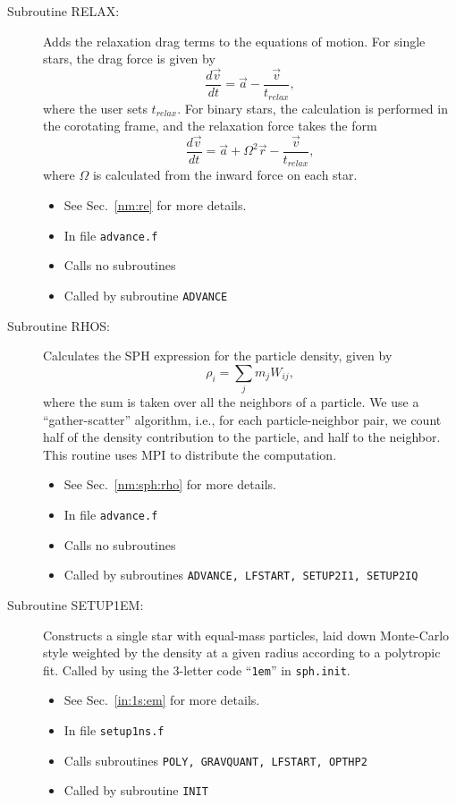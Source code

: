 \begin{description}
\item[Subroutine RELAX:] Adds the relaxation drag terms to the
equations of motion. For single stars, the drag force is given by 
\begin{equation}
\frac{d\vec{v}}{dt}=\vec{a}-\frac{\vec{v}}{t_{relax}},
\end{equation}
where the user sets $t_{relax}$.  For binary stars, the calculation is
performed in the corotating frame, and the relaxation force takes the
form
\begin{equation}
\frac{d\vec{v}}{dt}=\vec{a}+\Omega^2 \vec{r}-\frac{\vec{v}}{t_{relax}},
\end{equation}
where $\Omega$ is calculated from the inward force on each star.
\begin{itemize} 
\item See Sec.~\ref{nm:re} for more details.
\item In file {\tt advance.f}
\item Calls no subroutines
\item Called by subroutine {\tt ADVANCE}
\end{itemize}

\item[Subroutine RHOS:] Calculates the SPH expression for the particle
density, given by 
\begin{equation}
\rho_i=\sum_j m_j W_{ij},
\end{equation}
where the sum is taken over all the neighbors of a particle.
We use a ``gather-scatter'' algorithm, i.e., for each
particle-neighbor pair, we count half of the density contribution to
the particle, and half to the neighbor.  
This routine uses MPI to distribute the computation. 
\begin{itemize} 
\item See Sec.~\ref{nm:sph:rho} for more details.
\item In file {\tt advance.f}
\item Calls no subroutines
\item Called by subroutines {\tt ADVANCE, LFSTART, SETUP2I1, SETUP2IQ}
\end{itemize}

\item[Subroutine SETUP1EM:] Constructs a single star with equal-mass
particles, laid down Monte-Carlo style weighted by the density at a
given radius according to a polytropic fit.  Called by using the
3-letter code ``{\tt 1em}'' in {\tt sph.init}. 
\begin{itemize} 
\item See Sec.~\ref{in:1s:em} for more details.
\item In file {\tt setup1ns.f}
\item Calls subroutines {\tt POLY, GRAVQUANT, LFSTART, OPTHP2}
\item Called by subroutine {\tt INIT}
\end{itemize}


\end{description}
